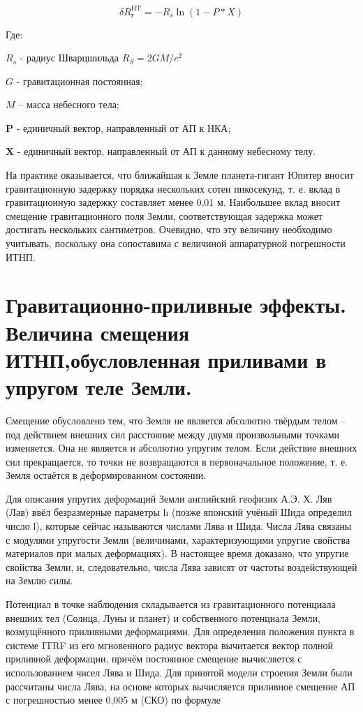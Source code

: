 \documentclass[14pt,a4paper,oneside]{extarticle}
\begin{document}
\[\delta R_\text{г}^{\mathrm{HT}}=-R_s\ln(1-P*X)\]

Где:

$R_s$ - радиус Шварцшильда $R_S=2GM/{c}^2$

$G$ - гравитационная постоянная;

$M$ – масса небесного тела;

$\boldsymbol{P}$ - единичный вектор, направленный от АП к НКА;

$\boldsymbol{X}$ - единичный вектор, направленный от АП к данному небесному телу.

На практике оказывается, что ближайшая к Земле планета-гигант Юпитер вносит гравитационную задержку порядка нескольких сотен пикосекунд, т. е. вклад в гравитационную задержку составляет менее 0,01 м. Наибольшее вклад вносит смещение гравитационного поля Земли, соответствующая задержка может достигать нескольких сантиметров. Очевидно, что эту величину необходимо учитывать, поскольку она сопоставима с величиной аппаратурной погрешности ИТНП.

\section{Гравитационно-приливные эффекты. Величина смещения ИТНП,обусловленная приливами в упругом теле Земли.}

Смещение обусловлено тем, что Земля не является абсолютно твёрдым телом – под действием внешних сил расстояние между двумя произвольными точками изменяется. Она не является и абсолютно упругим телом. Если действие внешних сил прекращается, то точки не возвращаются в первоначальное положение, т. е. Земля остаётся в деформированном состоянии.

Для описания упругих деформаций Земли английский геофизик А.Э. Х. Ляв (Лав) ввёл безразмерные параметры h (позже японский учёный Шида определил число l), которые сейчас называются числами Лява и Шида. Числа Лява связаны с модулями упругости Земли (величинами, характеризующими упругие свойства материалов при малых деформациях). В настоящее время доказано, что упругие свойства Земли, и, следовательно, числа Лява зависят от частоты воздействующей на Землю силы.

Потенциал в точке наблюдения складывается из гравитационного потенциала внешних тел (Солнца, Луны и планет) и собственного потенциала Земли, возмущённого приливными деформациями. Для определения положения пункта в системе ITRF из его мгновенного радиус вектора вычитается вектор полной приливной деформации, причём постоянное смещение вычисляется с использованием чисел Лява и Шида.
Для принятой модели строения Земли были рассчитаны числа Лява, на основе которых вычисляется приливное смещение АП с погрешностью менее 0,005 м (СКО) по формуле
\end{document}
